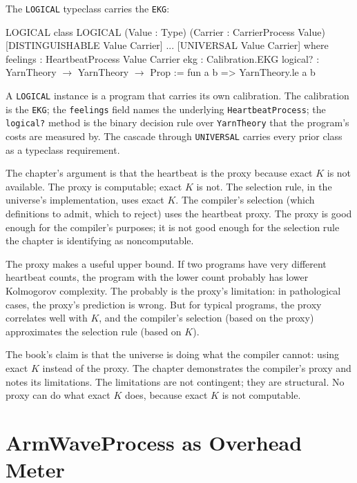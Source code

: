 The \texttt{LOGICAL} typeclass carries the \texttt{EKG}:

\begin{leanexcerpt}{LOGICAL}
class LOGICAL
    (Value : Type)
    (Carrier : CarrierProcess Value)
    [DISTINGUISHABLE Value Carrier] ... [UNIVERSAL Value Carrier]
  where
  feelings : HeartbeatProcess Value Carrier
  ekg      : Calibration.EKG
  logical? : YarnTheory $\to$ YarnTheory $\to$ Prop := fun a b =>
    YarnTheory.le a b
\end{leanexcerpt}

A \texttt{LOGICAL} instance is a program that carries its own
calibration. The calibration is the \texttt{EKG}; the
\texttt{feelings} field names the underlying
\texttt{HeartbeatProcess}; the \texttt{logical?} method is the
binary decision rule over \texttt{YarnTheory} that the program's
costs are measured by. The cascade through \texttt{UNIVERSAL}
carries every prior class as a typeclass requirement.

The chapter's argument is that the heartbeat is the proxy because
exact $K$ is not available. The proxy is computable; exact $K$ is
not. The selection rule, in the universe's implementation, uses
exact $K$. The compiler's selection (which definitions to admit,
which to reject) uses the heartbeat proxy. The proxy is good
enough for the compiler's purposes; it is not good enough for the
selection rule the chapter is identifying as noncomputable.

The proxy makes a useful upper bound. If two programs have very
different heartbeat counts, the program with the lower count
probably has lower Kolmogorov complexity. The probably is the
proxy's limitation: in pathological cases, the proxy's prediction
is wrong. But for typical programs, the proxy correlates well with
$K$, and the compiler's selection (based on the proxy) approximates
the selection rule (based on $K$).

The book's claim is that the universe is doing what the compiler
cannot: using exact $K$ instead of the proxy. The chapter
demonstrates the compiler's proxy and notes its limitations. The
limitations are not contingent; they are structural. No proxy can
do what exact $K$ does, because exact $K$ is not computable.

\section{ArmWaveProcess as Overhead Meter}
\label{se:armwaveprocess-as-overhead-meter}

